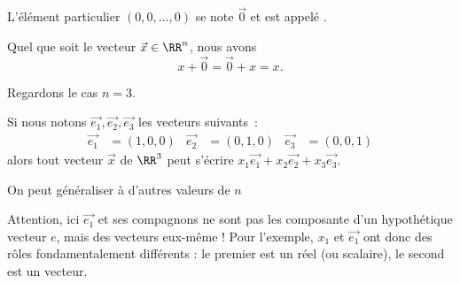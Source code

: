 \documentclass[french,xcolor=svgnames]{beamer}
\begin{document}
\begin{frame}%
  \begin{definition}
    L'élément particulier \((0, 0, \ldots, 0)\) se note \(\vec 0\) et est appelé .
  \end{definition}

  \begin{proposition}Quel que soit le vecteur \(\vec x\in \RR^{n}\), nous avons
    \begin{equation*}
      x + \vec 0 = \vec 0 + x = x.
    \end{equation*}
  \end{proposition}
\end{frame}

\begin{frame}%
  Regardons le cas \(n = 3\).\pause

  Si nous notons \(\vec {e_{1}}, \vec {e_{2}}, \vec {e_{3}}\) les vecteurs suivants~:
  \begin{align*}
    \vec {e_{1}} &= (1, 0, 0) & \vec {e_{2}} &= (0, 1, 0) & \vec {e_{3}} &= (0, 0, 1)
  \end{align*}\pause
  alors tout vecteur \(\vec x\) de \(\RR^{3}\) peut s'écrire \(x_{1}\vec {e_{1}} + x_{2} \vec {e_{2}} + x_{3} \vec {e_{3}}\).

\pause  On peut généraliser à d'autres valeurs de \(n\)
\pause
\begin{remark*}
  Attention, ici \(\vec {e_{1}}\) et ses compagnons ne sont pas les composante d'un hypothétique vecteur \(e\), mais des vecteurs eux-même ! Pour l'exemple, \(x_{1}\) et \(\vec {e_{1}}\) ont donc des rôles fondamentalement différents : le premier est un réel (ou \og scalaire\fg{}), le second est un vecteur.
\end{remark*}
\end{frame}

\end{document}
